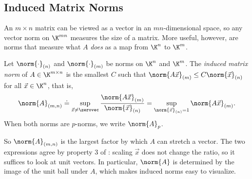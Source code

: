 \subsection{Induced Matrix Norms}

An $m \times n$ matrix can be viewed as a vector in an $mn$-dimensional space, so any vector norm on $\K^{mn}$ measures the size of a matrix. More useful, however, are norms that measure what $A$ \emph{does} as a map from $\K^n$ to $\K^m$.

\begin{definition}
  \label{def:induced}
  Let $\norm{\cdot}_{(n)}$ and $\norm{\cdot}_{(m)}$ be norms on $\K^n$ and $\K^m$. The \emph{induced matrix norm} of $A \in \K^{m \times n}$ is the smallest $C$ such that $\norm{A\vec{x}}_{(m)} \le C\norm{\vec{x}}_{(n)}$ for all $\vec{x} \in \K^n$, that is,
  \begin{equation}
    \norm{A}_{(m,n)} \doteq \sup_{\vec{x} \ne \zerovec}\frac{\norm{A\vec{x}}_{(m)}}{\norm{\vec{x}}_{(n)}} = \sup_{\norm{\vec{x}}_{(n)} = 1}\norm{A\vec{x}}_{(m)}.
  \end{equation}
  When both norms are $p$-norms, we write $\norm{A}_p$.
\end{definition}

So $\norm{A}_{(m,n)}$ is the largest factor by which $A$ can stretch a vector. The two expressions agree by property 3 of : scaling $\vec{x}$ does not change the ratio, so it suffices to look at unit vectors. In particular, $\norm{A}$ is determined by the image of the unit ball under $A$, which makes induced norms easy to visualize.

